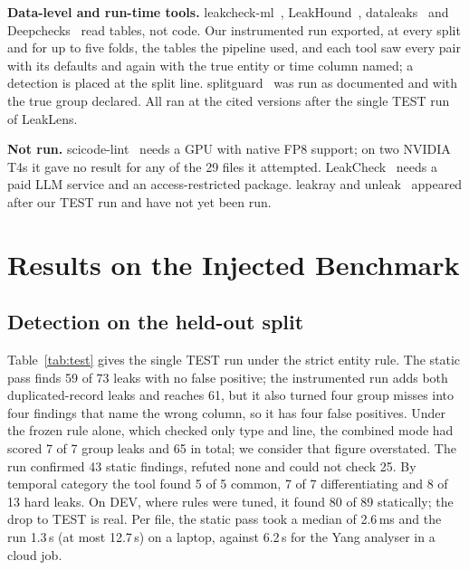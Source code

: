 \documentclass[conference]{IEEEtran}
\newcommand{\tool}{LeakLens}
\begin{document}
\textbf{Data-level and run-time tools.} leakcheck-ml~\cite{leakcheckml}, LeakHound~\cite{leakhound},
dataleaks~\cite{dataleaks} and Deepchecks~\cite{chorev2022} read tables, not code. Our instrumented run exported,
at every split and for up to five folds, the tables the pipeline used, and each tool saw every pair with its
defaults and again with the true entity or time column named; a detection is placed at the split line.
splitguard~\cite{splitguard} was run as documented and with the true group declared. All ran at the cited versions
after the single TEST run of \tool{}.

\textbf{Not run.} scicode-lint~\cite{samsonau2026} needs a GPU with native FP8 support; on two NVIDIA T4s it gave
no result for any of the 29 files it attempted. LeakCheck~\cite{draoui2026} needs a paid LLM service and an
access-restricted package. leakray and unleak~\cite{leakray,unleak} appeared after our TEST run and have not yet
been run.

\section{Results on the Injected Benchmark}

\subsection{Detection on the held-out split}

Table~\ref{tab:test} gives the single TEST run under the strict entity rule. The static pass finds 59 of 73 leaks
with no false positive; the instrumented run adds both duplicated-record leaks and reaches 61, but it also turned
four group misses into four findings that name the wrong column, so it has four false positives. Under the frozen
rule alone, which checked only type and line, the combined mode had scored 7 of 7 group leaks and 65 in total; we
consider that figure overstated. The run confirmed 43 static findings, refuted none and could not check 25. By
temporal category the tool found 5 of 5 common, 7 of 7 differentiating and 8 of 13 hard leaks. On DEV, where rules
were tuned, it found 80 of 89 statically; the drop to TEST is real. Per file, the static pass took a median of
2.6\,ms and the run 1.3\,s (at most 12.7\,s) on a laptop, against 6.2\,s for the Yang analyser in a cloud job.
\end{document}
